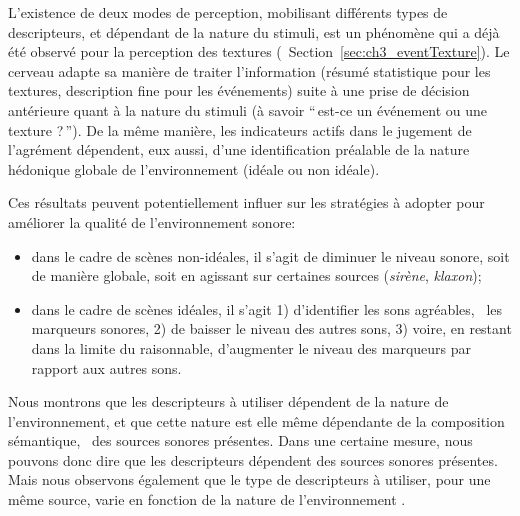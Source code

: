 L'existence de deux modes de perception, mobilisant différents types de descripteurs, et dépendant de la nature du stimuli, est un phénomène qui a déjà été observé pour la perception des textures (\cf~Section~\ref{sec:ch3_eventTexture}). Le cerveau adapte sa manière de traiter l'information (résumé statistique pour les textures, description fine pour les événements) suite à une prise de décision antérieure quant à la nature du stimuli (à savoir ``\,est-ce un événement ou une texture ?\,''). De la même manière, les indicateurs actifs dans le jugement de l'agrément dépendent, eux aussi, d'une identification préalable de la nature hédonique globale de l'environnement (idéale ou non idéale).

Ces résultats peuvent potentiellement influer sur les stratégies à adopter pour améliorer la qualité de l’environnement sonore:

\begin{itemize}
\item dans le cadre de scènes non-idéales, il s'agit de diminuer le niveau sonore, soit de manière globale, soit en agissant sur certaines sources (\emph{sirène}, \emph{klaxon});
\item dans le cadre de scènes idéales, il s'agit 1) d'identifier les sons agréables, \ie~les marqueurs sonores, 2) de baisser le niveau des autres sons, 3) voire, en restant dans la limite du raisonnable, d'augmenter le niveau des marqueurs par rapport aux autres sons.
\end{itemize}

Nous montrons que les descripteurs à utiliser dépendent de la nature de l'environnement, et que cette nature est elle même dépendante de la composition sémantique, \ie~des sources sonores présentes. Dans une certaine mesure, nous pouvons donc dire que les descripteurs dépendent des sources sonores présentes. Mais nous observons également que le type de descripteurs à utiliser, pour une même source, varie en fonction de la nature de l'environnement . \\



